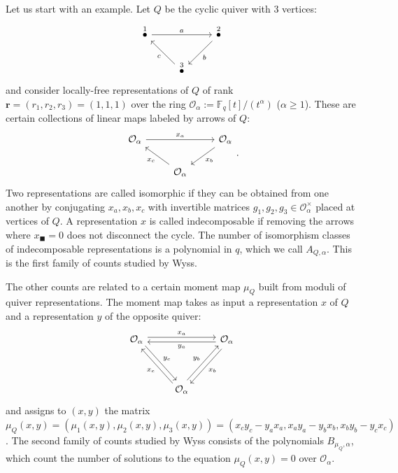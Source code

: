 \documentclass[11pt,english]{article}
\numberwithin{equation}{section}
\numberwithin{figure}{section}
\theoremstyle{definition}
\theoremstyle{plain}
\theoremstyle{remark}
\newcommand\rr{\mathbf{r}}
\newcommand\FF{\mathbb{F}}
\begin{document}
Let us start with an example. Let $Q$ be the cyclic quiver with 3
vertices:\[
\begin{tikzcd}[ampersand replacement=\&]
\overset{1}{\bullet} \ar[rr,"a"] \& \& \overset{2}{\bullet} \ar[dl,"b"] \\
\& \overset{3}{\bullet} \ar[ul,"c"] \& 
\end{tikzcd}
\]and consider locally-free representations of $Q$ of rank $\rr=(r_{1},r_{2},r_{3})=(1,1,1)$
over the ring $\mathcal{O}_{\alpha}:=\FF_{q}[t]/(t^{\alpha})$ ($\alpha\geq1$).
These are certain collections of linear maps labeled by arrows of
$Q$:\[
\begin{tikzcd}[ampersand replacement=\&]
\mathcal{O}_{\alpha} \ar[rr,"x_a"] \& \& \mathcal{O}_{\alpha} \ar[dl,"x_b"] \\
\& \mathcal{O}_{\alpha} \ar[ul,"x_c"] \& 
\end{tikzcd}
.
\]Two representations are called isomorphic if they can be obtained
from one another by conjugating $x_{a},x_{b},x_{c}$ with invertible
matrices $g_{1},g_{2},g_{3}\in\mathcal{O}_{\alpha}^{\times}$ placed
at vertices of $Q$. A representation $x$ is called indecomposable
if removing the arrows where $x_{\blacksquare}=0$ does not disconnect
the cycle. The number of isomorphism classes of indecomposable representations
is a polynomial in $q$, which we call $A_{Q,\alpha}$. This is the
first family of counts studied by Wyss.

The other counts are related to a certain moment map $\mu_{Q}$ built
from moduli of quiver representations. The moment map takes as input
a representation $x$ of $Q$ and a representation $y$ of the opposite
quiver:\[
\begin{tikzcd}[ampersand replacement=\&]
\mathcal{O}_{\alpha} \ar[rr,"x_a", shift left]\ar[ddr,"y_c", shift left] \& \& \mathcal{O}_{\alpha} \ar[ddl,"x_b", shift left]\ar[ll,"y_a", shift left] \\
\& \& \\
\& \mathcal{O}_{\alpha} \ar[uul,"x_c", shift left]\ar[uur,"y_b", shift left] \& 
\end{tikzcd}
\]and assigns to $(x,y)$ the matrix $\mu_{Q}(x,y)=(\mu_{1}(x,y),\mu_{2}(x,y),\mu_{3}(x,y))=(x_{c}y_{c}-y_{a}x_{a},x_{a}y_{a}-y_{b}x_{b},x_{b}y_{b}-y_{c}x_{c})$.
The second family of counts studied by Wyss consists of the polynomials
$B_{\mu_{Q},\alpha}$, which count the number of solutions to the
equation $\mu_{Q}(x,y)=0$ over $\mathcal{O}_{\alpha}$.
\end{document}
